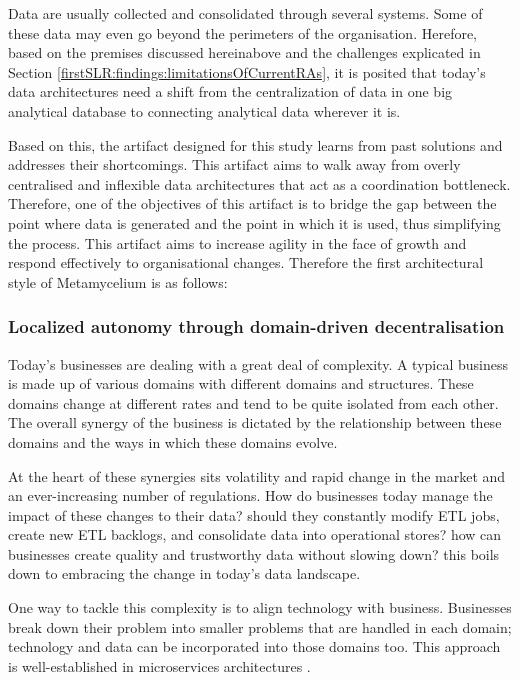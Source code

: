 \documentclass[preprint,12pt]{elsarticle}
\begin{document}
Data are usually collected and consolidated through several systems. Some of these data may even go beyond the perimeters of the organisation. Herefore, based on the premises discussed hereinabove and the challenges explicated in Section \ref{firstSLR:findings:limitationsOfCurrentRAs}, it is posited that today's data architectures need a shift from the centralization of data in one big analytical database to connecting analytical data wherever it is. 

Based on this, the artifact designed for this study learns from past solutions and addresses their shortcomings. This artifact aims to walk away from overly centralised and inflexible data architectures that act as a coordination bottleneck. Therefore, one of the objectives of this artifact is to bridge the gap between the point where data is generated and the point in which it is used, thus simplifying the process. This artifact aims to increase agility in the face of growth and respond effectively to organisational changes. Therefore the first architectural style of Metamycelium is as follows: 


\subsubsection{Localized autonomy through domain-driven decentralisation}

Today's businesses are dealing with a great deal of complexity. A typical business is made up of various domains with different domains and structures. These domains change at different rates and tend to be quite isolated from each other. The overall synergy of the business is dictated by the relationship between these domains and the ways in which these domains evolve. 

At the heart of these synergies sits volatility and rapid change in the market and an ever-increasing number of regulations. How do businesses today manage the impact of these changes to their data? should they constantly modify ETL jobs, create new ETL backlogs, and consolidate data into operational stores? how can businesses create quality and trustworthy data without slowing down? this boils down to embracing the change in today's data landscape. 

One way to tackle this complexity is to align technology with business. Businesses break down their problem into smaller problems that are handled in each domain; technology and data can be incorporated into those domains too. This approach is well-established in microservices architectures \cite{ataei2023application}. 
\end{document}
